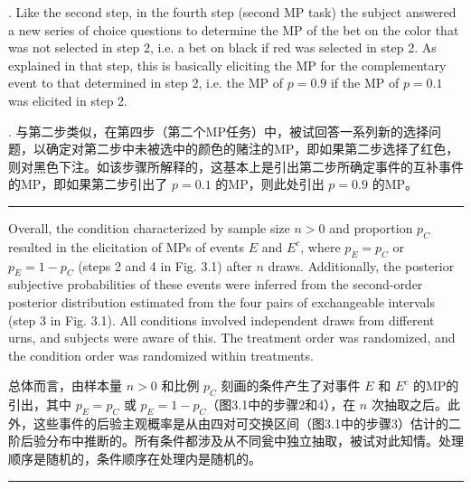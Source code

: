 \documentclass[12pt,a4paper]{article}
\newenvironment{original}
  {\par\vspace{0.5em}\noindent\color{black}\ignorespaces}
  {\par\vspace{0.3em}}
\newenvironment{translation}
  {\par\noindent\color{transblue}\ignorespaces}
  {\par\vspace{0.8em}\hrule\vspace{0.5em}}
\begin{document}
\begin{original}
4. Like the second step, in the fourth step (second MP task) the subject answered a new series of choice questions to determine the MP of the bet on the color that was not selected in step 2, i.e. a bet on black if red was selected in step 2. As explained in that step, this is basically eliciting the MP for the complementary event to that determined in step 2, i.e. the MP of $p = 0.9$ if the MP of $p = 0.1$ was elicited in step 2.
\end{original}

\begin{translation}
4. 与第二步类似，在第四步（第二个MP任务）中，被试回答一系列新的选择问题，以确定对第二步中未被选中的颜色的赌注的MP，即如果第二步选择了红色，则对黑色下注。如该步骤所解释的，这基本上是引出第二步所确定事件的互补事件的MP，即如果第二步引出了 $p = 0.1$ 的MP，则此处引出 $p = 0.9$ 的MP。
\end{translation}

\begin{original}
Overall, the condition characterized by sample size $n > 0$ and proportion $p_C$ resulted in the elicitation of MPs of events $E$ and $E^c$, where $p_E = p_C$ or $p_E = 1 - p_C$ (steps 2 and 4 in Fig. 3.1) after $n$ draws. Additionally, the posterior subjective probabilities of these events were inferred from the second-order posterior distribution estimated from the four pairs of exchangeable intervals (step 3 in Fig. 3.1). All conditions involved independent draws from different urns, and subjects were aware of this. The treatment order was randomized, and the condition order was randomized within treatments.
\end{original}

\begin{translation}
总体而言，由样本量 $n > 0$ 和比例 $p_C$ 刻画的条件产生了对事件 $E$ 和 $E^c$ 的MP的引出，其中 $p_E = p_C$ 或 $p_E = 1 - p_C$（图3.1中的步骤2和4），在 $n$ 次抽取之后。此外，这些事件的后验主观概率是从由四对可交换区间（图3.1中的步骤3）估计的二阶后验分布中推断的。所有条件都涉及从不同瓮中独立抽取，被试对此知情。处理顺序是随机的，条件顺序在处理内是随机的。
\end{translation}
\end{document}
